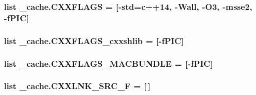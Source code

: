 \subsubsection[{\texorpdfstring{C\+X\+X\+F\+L\+A\+GS}{CXXFLAGS}}]{\setlength{\rightskip}{0pt plus 5cm}list \+\_\+cache.\+C\+X\+X\+F\+L\+A\+GS = \mbox{[}\textquotesingle{}-\/std=c++14\textquotesingle{}, \textquotesingle{}-\/Wall\textquotesingle{}, \textquotesingle{}-\/O3\textquotesingle{}, \textquotesingle{}-\/msse2\textquotesingle{}, \textquotesingle{}-\/f\+P\+IC\textquotesingle{}\mbox{]}}\hypertarget{namespace__cache_a2c3fafbcc76e0cda705550d52d322852}{}\label{namespace__cache_a2c3fafbcc76e0cda705550d52d322852}
\subsubsection[{\texorpdfstring{C\+X\+X\+F\+L\+A\+G\+S\+\_\+cxxshlib}{CXXFLAGS_cxxshlib}}]{\setlength{\rightskip}{0pt plus 5cm}list \+\_\+cache.\+C\+X\+X\+F\+L\+A\+G\+S\+\_\+cxxshlib = \mbox{[}\textquotesingle{}-\/f\+P\+IC\textquotesingle{}\mbox{]}}\hypertarget{namespace__cache_a65efe608b21d6ef648a4d11d85fb7d19}{}\label{namespace__cache_a65efe608b21d6ef648a4d11d85fb7d19}
\subsubsection[{\texorpdfstring{C\+X\+X\+F\+L\+A\+G\+S\+\_\+\+M\+A\+C\+B\+U\+N\+D\+LE}{CXXFLAGS_MACBUNDLE}}]{\setlength{\rightskip}{0pt plus 5cm}list \+\_\+cache.\+C\+X\+X\+F\+L\+A\+G\+S\+\_\+\+M\+A\+C\+B\+U\+N\+D\+LE = \mbox{[}\textquotesingle{}-\/f\+P\+IC\textquotesingle{}\mbox{]}}\hypertarget{namespace__cache_a430f24190c7f5995177dff92ce6caf55}{}\label{namespace__cache_a430f24190c7f5995177dff92ce6caf55}
\subsubsection[{\texorpdfstring{C\+X\+X\+L\+N\+K\+\_\+\+S\+R\+C\+\_\+F}{CXXLNK_SRC_F}}]{\setlength{\rightskip}{0pt plus 5cm}list \+\_\+cache.\+C\+X\+X\+L\+N\+K\+\_\+\+S\+R\+C\+\_\+F = \mbox{[}$\,$\mbox{]}}\hypertarget{namespace__cache_ab36d6a7f4b093a037803492ee078e43c}{}\label{namespace__cache_ab36d6a7f4b093a037803492ee078e43c}
